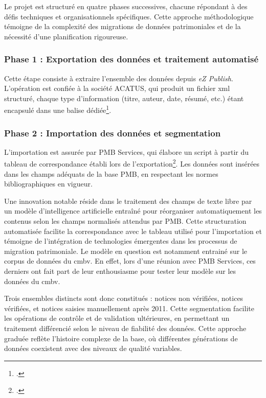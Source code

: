 Le projet est structuré en quatre phases successives, chacune répondant à des défis techniques et organisationnels spécifiques. Cette approche méthodologique témoigne de la complexité des migrations de données patrimoniales et de la nécessité d'une planification rigoureuse.

\subsubsection{Phase 1 : Exportation des données et traitement automatisé}

Cette étape consiste à extraire l'ensemble des données depuis \textit{eZ Publish}. L'opération est confiée à la société ACATUS, qui produit un fichier \gls{xml} structuré, chaque type d'information (titre, auteur, date, résumé, etc.) étant encapsulé dans une balise dédiée\footcite{marcolocascioMigrationBaseDonnees2024}.

\subsubsection{Phase 2 : Importation des données et segmentation}

L'importation est assurée par PMB Services, qui élabore un script à partir du tableau de correspondance établi lors de l'exportation\footcite{marcolocascioMigrationBaseDonnees2024a}. Les données sont insérées dans les champs adéquats de la base PMB, en respectant les normes bibliographiques en vigueur.

Une innovation notable réside dans le traitement des champs de texte libre par un modèle d'intelligence artificielle entraîné pour réorganiser automatiquement les contenus selon les champs normalisés attendus par PMB. Cette structuration automatisée facilite la correspondance avec le tableau utilisé pour l'importation et témoigne de l'intégration de technologies émergentes dans les processus de migration patrimoniale. Le modèle en question est notamment entrainé sur le corpus de données du \gls{cmbv}. En effet, lors d'une réunion avec PMB Services, ces derniers ont fait part de leur enthousiasme pour tester leur modèle sur les données du \gls{cmbv}.

Trois ensembles distincts sont donc constitués : notices non vérifiées, notices vérifiées, et notices saisies manuellement après 2011. Cette segmentation facilite les opérations de contrôle et de validation ultérieures, en permettant un traitement différencié selon le niveau de fiabilité des données. Cette approche graduée reflète l'histoire complexe de la base, où différentes générations de données coexistent avec des niveaux de qualité variables.

